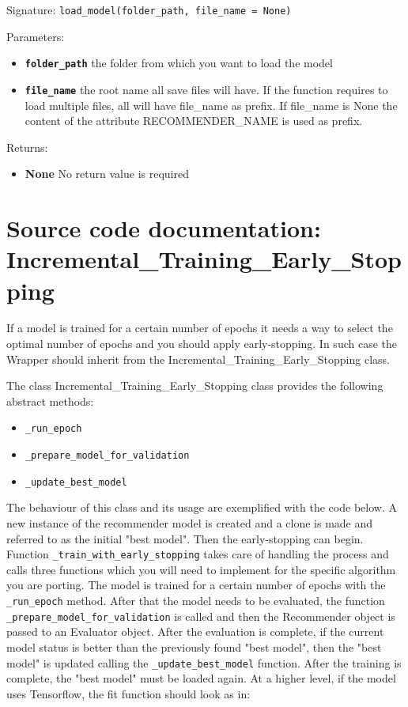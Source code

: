 Signature: \texttt{load\_model(folder\_path, file\_name = None)}

Parameters:
\begin{itemize}
    \item \textbf{\texttt{folder\_path}} the folder from which you want to load the model
    \item \textbf{\texttt{file\_name}} the root name all save files will have. If the function requires to load multiple files, all will have file\_name as prefix. If file\_name is None the content of the attribute RECOMMENDER\_NAME is used as prefix.

\end{itemize}

Returns:
\begin{itemize}
    \item \textbf{None} No return value is required
\end{itemize}





\clearpage

\section{Source code documentation: Incremental\_Training\_Early\_Stopping}
\label{sec:source_documentation_EarlyStopping}

If a model is trained for a certain number of epochs it needs a way to select the optimal number of epochs and you should apply early-stopping. In such case the Wrapper should inherit from the Incremental\_Training\_Early\_Stopping class.


The class Incremental\_Training\_Early\_Stopping class provides the following abstract methods:

\begin{itemize}
    \item \texttt{\_run\_epoch}
    \item \texttt{\_prepare\_model\_for\_validation}
    \item \texttt{\_update\_best\_model}
\end{itemize}

The behaviour of this class and its usage are exemplified with the code below. A new instance of the recommender model is created and a clone is made and referred to as the initial "best model". Then the early-stopping can begin. Function \texttt{\_train\_with\_early\_stopping} takes care of handling the process and calls three functions which you will need to implement for the specific algorithm you are porting.
The model is trained for a certain number of epochs with the \texttt{\_run\_epoch} method. After that the model needs to be evaluated, the function \texttt{\_prepare\_model\_for\_validation} is called and then the Recommender object is passed to an Evaluator object. After the evaluation is complete, if the current model status is better than the previously found "best model", then the "best model" is updated calling the \texttt{\_update\_best\_model} function.
After the training is complete, the "best model" must be loaded again. At a higher level, if the model uses Tensorflow, the fit function should look as in:

